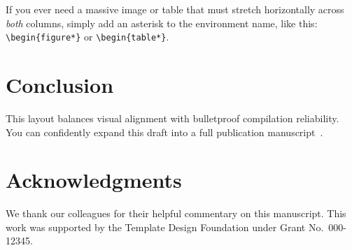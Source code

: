 \documentclass[11pt,twocolumn]{article}
\begin{document}
If you ever need a massive image or table that must stretch horizontally across \textit{both} columns, simply add an asterisk to the environment name, like this: \texttt{\textbackslash begin\{figure*\}} or \texttt{\textbackslash begin\{table*\}}.

\section{Conclusion}
This layout balances visual alignment with bulletproof compilation reliability. You can confidently expand this draft into a full publication manuscript~\cite{goodfellow2016}.

\section*{Acknowledgments}
We thank our colleagues for their helpful commentary on this manuscript. This work was supported by the Template Design Foundation under Grant No.~000-12345.

\small


\end{document}
